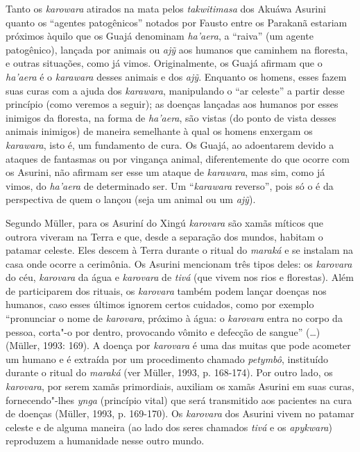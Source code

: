 Tanto os \emph{karowara} atirados na mata pelos \emph{takwitimasa} dos
Akuáwa Asurini quanto os ``agentes patogênicos'' notados por Fausto entre
os Parakanã estariam próximos àquilo que os Guajá denominam
\emph{ha'aera}, a ``raiva'' (um agente patogênico), lançada por animais ou
\emph{ajỹ} aos humanos que caminhem na floresta, e outras situações,
como já vimos. Originalmente, os Guajá afirmam que o \emph{ha'aera} é o
\emph{karawara} desses animais e dos \emph{ajỹ}. Enquanto os homens,
esses fazem suas curas com a ajuda dos \emph{karawara}, manipulando o
``ar celeste'' a partir desse princípio (como veremos a seguir); as
doenças lançadas aos humanos por esses inimigos da floresta, na forma de
\emph{ha'aera}, são vistas (do ponto de vista desses animais inimigos)
de maneira semelhante à qual os homens enxergam os \emph{karawara}, isto
é, um fundamento de cura. Os Guajá, ao adoentarem devido a ataques de
fantasmas ou por vingança animal, diferentemente do que ocorre com os
Asurini, não afirmam ser esse um ataque de \emph{karawara}, mas sim,
como já vimos, do \emph{ha'aera} de determinado ser. Um ``\emph{karawara}
reverso'', pois só o é da perspectiva de quem o lançou (seja um animal ou
um \emph{ajỹ}).

Segundo Müller, para os Asuriní do Xingú \emph{karovara} são xamãs
míticos que outrora viveram na Terra e que, desde a separação dos
mundos, habitam o patamar celeste. Eles descem à Terra durante o ritual
do \emph{maraká} e se instalam na casa onde ocorre a cerimônia. Os
Asurini mencionam três tipos deles: os \emph{karovara} do céu,
\emph{karovara} da água e \emph{karovara} de \emph{tivá} (que vivem nos
rios e florestas). Além de participarem dos rituais, os \emph{karovara}
também podem lançar doenças nos humanos, caso esses últimos ignorem
certos cuidados, como por exemplo ``pronunciar o nome de \emph{karovara},
próximo à água: o \emph{karovara} entra no corpo da pessoa, corta"-o por
dentro, provocando vômito e defecção de sangue'' (\ldots{}) (Müller, 1993:
169). A doença por \emph{karovara} é uma das muitas que pode acometer um
humano e é extraída por um procedimento chamado \emph{petymbô},
instituído durante o ritual do \emph{maraká} (ver Müller, 1993, p.
168-174). Por outro lado, os \emph{karovara}, por serem xamãs
primordiais, auxiliam os xamãs Asurini em suas curas, fornecendo"-lhes
\emph{ynga} (princípio vital) que será transmitido aos pacientes na cura
de doenças (Müller, 1993, p. 169-170). Os \emph{karovara} dos Asurini
vivem no patamar celeste e de alguma maneira (ao lado dos seres chamados
\emph{tivá} e os \emph{apykwara}) reproduzem a humanidade nesse outro
mundo.

